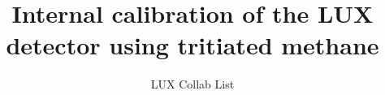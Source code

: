 \documentclass[12pt,twocolumn]{article}
\begin{document}
\title{Internal calibration of the LUX detector using tritiated methane}
\author{LUX Collab List}

\twocolumn[
\begin{@twocolumnfalse}
\maketitle



\end{@twocolumnfalse}
]









   









{}


\end{document}
